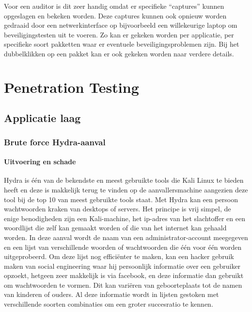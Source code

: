 \documentclass[pdftex,a4paper,12pt]{report}
\begin{document}
Voor een auditor is dit zeer handig omdat er specifieke "`captures"' kunnen opgeslagen en bekeken worden. Deze captures kunnen ook opnieuw worden gedraaid door een netwerkinterface op bijvoorbeeld een willekeurige laptop om beveiligingstesten uit te voeren. Zo kan er gekeken worden per applicatie, per specifieke soort pakketten waar er eventuele beveiligingsproblemen zijn. Bij het dubbelklikken op een pakket kan er ook gekeken worden naar verdere details. 

\chapter{Penetration Testing}
\section{Applicatie laag}
\subsection{Brute force Hydra-aanval}
\subsubsection{Uitvoering en schade}
Hydra is één van de bekendste en meest gebruikte tools die Kali Linux te bieden heeft en deze is makkelijk terug te vinden op de aanvallersmachine aangezien deze tool bij de top 10 van meest gebruikte tools staat. Met Hydra kan een persoon wachtwoorden kraken van desktops of servers. Het principe is vrij simpel, de enige benodigheden zijn een Kali-machine, het ip-adres van het slachtoffer en een woordlijst die zelf kan gemaakt worden of die van het internet kan gehaald worden. In deze aanval wordt de naam van een administrator-account meegegeven en een lijst van verschillende woorden of wachtwoorden die één voor één worden uitgeprobeerd. Om deze lijst nog efficiënter te maken, kan een hacker gebruik maken van social engineering waar hij persoonlijk informatie over een gebruiker opzoekt, hetgeen zeer makkelijk is via facebook, en deze informatie dan gebruikt om wachtwoorden te vormen. Dit kan variëren van geboorteplaats tot de namen van kinderen of ouders. Al deze informatie wordt in lijsten gestoken met verschillende soorten combinaties om een groter succesratio te kennen. \citep{Wilde2013} \newline 
\end{document}
